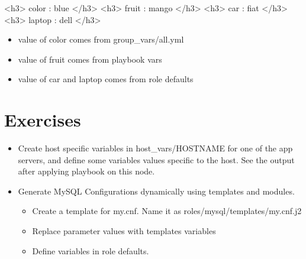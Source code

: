 \begin{code}

 <h3> color     : blue </h3>
 <h3> fruit     : mango </h3>
 <h3> car       : fiat </h3>
 <h3> laptop    : dell </h3>

\end{code}

\begin{itemize}
\item value of color comes from group\_vars/all.yml  
\item value of fruit comes from playbook vars  
\item value of car and laptop comes from role defaults
\end{itemize}

\section{Exercises}

\begin{itemize}
\item Create host specific variables in host\_vars/HOSTNAME for one of the app servers, and define some variables values specific to the host. See the output after applying playbook on this node.  
\item Generate MySQL Configurations dynamically using templates and modules.  

\begin{itemize}
\item Create a template for my.cnf.  Name it as roles/mysql/templates/my.cnf.j2  
\item Replace parameter values with templates variables  
\item Define variables in role defaults.
\end{itemize}
\end{itemize}